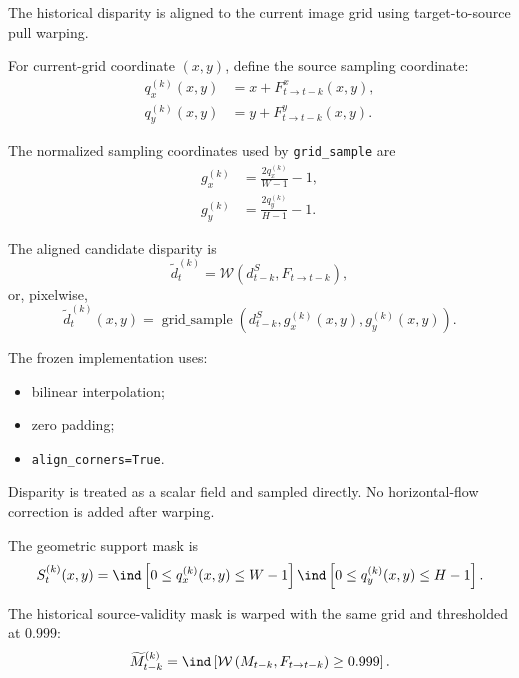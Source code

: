\documentclass[11pt,a4paper]{article}
\providecommand{\warp}{\mathcal{W}}
\begin{document}
The historical disparity is aligned to the current image grid using
target-to-source pull warping.

For current-grid coordinate \((x,y)\), define the source sampling
coordinate:
%
\begin{align}
q_x^{(k)}(x,y)
&=
x+
F_{t\rightarrow t-k}^{x}(x,y),
\\
q_y^{(k)}(x,y)
&=
y+
F_{t\rightarrow t-k}^{y}(x,y).
\end{align}

The normalized sampling coordinates used by
\texttt{grid\_sample} are
%
\begin{align}
g_x^{(k)}
&=
\frac{2q_x^{(k)}}{W-1}-1,
\\
g_y^{(k)}
&=
\frac{2q_y^{(k)}}{H-1}-1.
\end{align}

The aligned candidate disparity is
%
\begin{equation}
\widetilde d_t^{(k)}
=
\warp
\left(
d_{t-k}^S,
F_{t\rightarrow t-k}
\right),
\label{eq:aligned_candidate}
\end{equation}
%
or, pixelwise,
%
\begin{equation}
\widetilde d_t^{(k)}(x,y)
=
\operatorname{grid\_sample}
\left(
d_{t-k}^S,
g_x^{(k)}(x,y),
g_y^{(k)}(x,y)
\right).
\end{equation}

The frozen implementation uses:

\begin{itemize}
    \item bilinear interpolation;
    \item zero padding;
    \item \texttt{align\_corners=True}.
\end{itemize}

Disparity is treated as a scalar field and sampled directly. No
horizontal-flow correction is added after warping.

The geometric support mask is
%
\begin{equation}
S_t^{(k)}(x,y)
=
\ind
\left[
0\leq q_x^{(k)}(x,y)\leq W-1
\right]
\ind
\left[
0\leq q_y^{(k)}(x,y)\leq H-1
\right].
\label{eq:warp_support}
\end{equation}

The historical source-validity mask is warped with the same grid and
thresholded at \(0.999\):
%
\begin{equation}
\widetilde M_{t-k}^{(k)}
=
\ind
\left[
\warp
\left(
M_{t-k},
F_{t\rightarrow t-k}
\right)
\geq0.999
\right].
\label{eq:warped_source_validity}
\end{equation}
\end{document}

